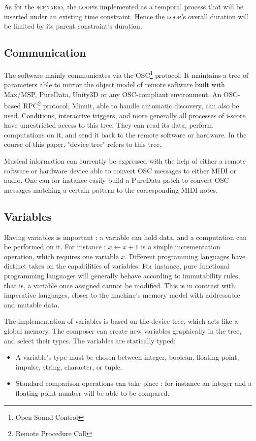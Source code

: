 \documentclass{article}
\newcommand{\scenario}{\textsc{scenario}}
\newcommand{\Loop}{\textsc{loop}}
\begin{document}
As for the \scenario, the \Loop is implemented as a temporal process that will be inserted under an existing time constraint. 
Hence the \Loop's overall duration will be limited by its parent constraint's duration.

\subsection{Communication}
The software mainly communicates via the OSC\footnote{Open Sound Control} protocol.
It maintains a tree of parameters able to mirror 
the object model of remote software built with Max/MSP, PureData, Unity3D or any OSC-compliant environment. 
An OSC-based RPC\footnote{Remote Procedure Call} protocol, Minuit, able to handle automatic discovery, can also be used. 
Conditions, interactive triggers, and more generally all processes of i-score have unrestricted 
access to this tree.
They can read its data, perform computations on it, and send it back to the remote software or hardware.
In the course of this paper, "device tree" refers to this tree.

Musical information can currently be expressed with the help of either a remote software or hardware device able 
to convert OSC messages to either MIDI or audio.
One can for instance easily build a PureData patch to convert OSC messages matching a certain pattern 
to the corresponding MIDI notes.

\subsection{Variables}
Having variables is important : a variable can hold data, 
and a computation can be performed on it.
For instance : $x \leftarrow x + 1$ is a simple incrementation 
operation, which requires one variable $x$.
Different programming languages have distinct takes on the 
capabilities of variables.
For instance, pure functional programming languages will generally 
behave according to immutability rules, that is, a variable once 
assigned cannot be modified.
This is in contrast with imperative languages, closer 
to the machine's memory model with addressable and mutable data.

The implementation of variables is based on the device tree, which 
acts like a global memory. 
The composer can create new variables graphically in the tree, and select their types.
The variables are statically typed: 
\begin{itemize}
    \item A variable's type must be chosen between integer, boolean, floating point, impulse, string, character, or tuple.
    \item Standard comparison operations can take place : for instance an integer and a floating point number will be able to be compared.
\end{itemize} 
\end{document}
